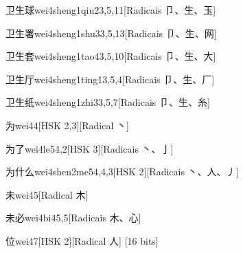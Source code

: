 \begin{entry}{卫生球}{wei4sheng1qiu2}{3,5,11}[Radicais ⼙、⽣、⽟]
\end{entry}

\begin{entry}{卫生署}{wei4sheng1shu3}{3,5,13}[Radicais ⼙、⽣、⽹]
\end{entry}

\begin{entry}{卫生套}{wei4sheng1tao4}{3,5,10}[Radicais ⼙、⽣、⼤]
\end{entry}

\begin{entry}{卫生厅}{wei4sheng1ting1}{3,5,4}[Radicais ⼙、⽣、⼚]
\end{entry}

\begin{entry}{卫生纸}{wei4sheng1zhi3}{3,5,7}[Radicais ⼙、⽣、⽷]
\end{entry}

\begin{entry}{为}{wei4}{4}[HSK 2,3][Radical ⼂]
\end{entry}

\begin{entry}{为了}{wei4le5}{4,2}[HSK 3][Radicais ⼂、⼅]
\end{entry}

\begin{entry}{为什么}{wei4shen2me5}{4,4,3}[HSK 2][Radicais ⼂、⼈、⼃]
\end{entry}

\begin{entry}{未}{wei4}{5}[Radical ⽊]
\end{entry}

\begin{entry}{未必}{wei4bi4}{5,5}[Radicais ⽊、⼼]
\end{entry}

\begin{entry}{位}{wei4}{7}[HSK 2][Radical ⼈]
  [16 bits]
\end{entry}

